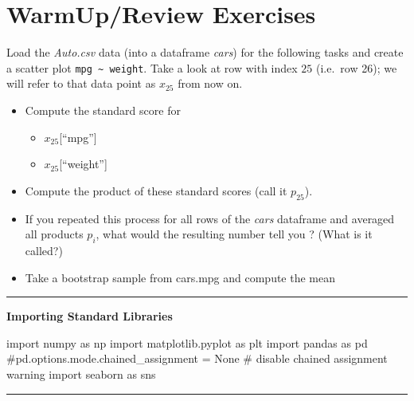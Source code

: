 \documentclass[
  letterpaper,
  DIV=11,
  numbers=noendperiod]{scrreprt}
\newenvironment{Shaded}{\begin{snugshade}}{\end{snugshade}}
\newcommand{\CommentTok}[1]{\textcolor[rgb]{0.37,0.37,0.37}{#1}}
\newcommand{\ImportTok}[1]{\textcolor[rgb]{0.00,0.46,0.62}{#1}}
\newcommand{\NormalTok}[1]{\textcolor[rgb]{0.00,0.23,0.31}{#1}}
\providecommand{\tightlist}{%
  \setlength{\itemsep}{0pt}\setlength{\parskip}{0pt}}\usepackage{longtable,booktabs,array}
\begin{document}
\hypertarget{warmupreview-exercises}{%
\section{WarmUp/Review Exercises}\label{warmupreview-exercises}}

Load the \emph{Auto.csv} data (into a dataframe \emph{cars}) for the
following tasks and create a scatter plot
\texttt{mpg\ \textasciitilde{}\ weight}. Take a look at row with index
\(25\) (i.e.~row 26); we will refer to that data point as \(x_{25}\)
from now on.

\begin{itemize}
\tightlist
\item
  Compute the standard score for

  \begin{itemize}
  \tightlist
  \item
    \(x_{25}\){[}``mpg''{]}
  \item
    \(x_{25}\){[}``weight''{]}
  \end{itemize}
\item
  Compute the product of these standard scores (call it \(p_{25}\)).
\item
  If you repeated this process for all rows of the \emph{cars} dataframe
  and averaged all products \(p_{i}\), what would the resulting number
  tell you ? (What is it called?)
\item
  Take a bootstrap sample from cars.mpg and compute the mean
\end{itemize}

\begin{center}\rule{0.5\linewidth}{0.5pt}\end{center}

\textbf{Importing Standard Libraries}

\begin{Shaded}
\begin{Highlighting}[]
\ImportTok{import}\NormalTok{ numpy }\ImportTok{as}\NormalTok{ np}
\ImportTok{import}\NormalTok{ matplotlib.pyplot }\ImportTok{as}\NormalTok{ plt}
\ImportTok{import}\NormalTok{ pandas }\ImportTok{as}\NormalTok{ pd}
\CommentTok{\#pd.options.mode.chained\_assignment = None \# disable chained assignment warning}
\ImportTok{import}\NormalTok{ seaborn }\ImportTok{as}\NormalTok{ sns}
\end{Highlighting}
\end{Shaded}

\begin{center}\rule{0.5\linewidth}{0.5pt}\end{center}
\end{document}

